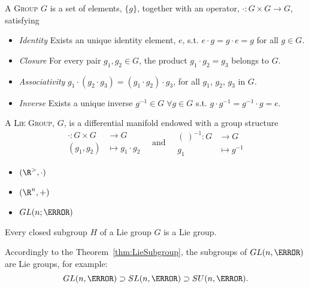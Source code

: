 \begin{Def}[Group]
  A  \textsc{Group} $G$ is a set of elements, $\{g\}$, together with an operator, $\cdot: G \times G \to G$, satisfying
  \begin{itemize}
  \item \emph{Identity} Exists an unique identity element, $e$, s.t. $e \cdot g = g \cdot e =g$ for all $g \in G$.
  \item \emph{Closure} For every pair $g_1, g_2\in G$, the product $g_1\cdot g_2 = g_3$ belongs to $G$.
  \item \emph{Associativity} $g_1 \cdot (g_2 \cdot g_3) = (g_1 \cdot g_2) \cdot g_3$, for all $g_1$, $g_2$, $g_3$ in $G$.
  \item \emph{Inverse} Exists a unique inverse $g^{-1} \in G\; \forall g \in G$ s.t. $g \cdot g^{-1} = g^{-1} \cdot g = e$.
  \end{itemize}
\end{Def}

\begin{Def}
  A \textsc{Lie Group}, $G$, is a differential manifold endowed with a group structure
  \begin{equation}
    \begin{split}
      \cdot: G \times G &\to G \\
      (g_1,g_2) &\mapsto g_1 \cdot g_2
    \end{split}
    \quad
    \text{and}
    \quad
    \begin{split}
      (\ )^{-1}: G &\to G \\
      g_1 &\mapsto g^{-1}
    \end{split}
  \end{equation}
\end{Def}

\begin{Exa}
  \mbox{}
  \begin{itemize}
  \item $(\R^>,\cdot)$
  \item $(\R^n,+)$
  \item $GL(n;\K)$
  \end{itemize}
\end{Exa}

\begin{Thm}\label{thm:LieSubgroup}
  Every closed subgroup $H$ of a Lie group $G$ is a Lie group.
\end{Thm}

Accordingly to the Theorem~\ref{thm:LieSubgroup}, the subgroups of $GL(n,\K)$ are Lie groups, for example:
\begin{equation*}
  GL(n,\K) \supset SL(n,\K) \supset SU(n,\K).
\end{equation*}

